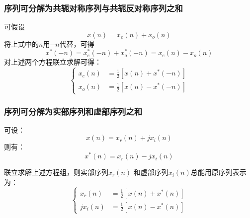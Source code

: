 \documentclass[notheorems,compress,mathserif,table]{beamer}
\begin{document}
\begin{frame}\frametitle{序列可分解为共轭对称序列与共轭反对称序列之和}%

可假设
\begin{equation*}
x(n) = x_{e}(n) + x_{o}(n)%
\end{equation*}
将上式中的$n$用$-n$代替，可得
\begin{equation*}
x^{*}(-n) = x^{*}_{e}(-n) + x^{*}_{o}(-n) = x_{e}(n) - x_{o}(n)
\end{equation*}
对上述两个方程联立求解可得：
\begin{equation*}
\left\{ \begin{aligned}
x_{e}(n) &= \frac{1}{2}[x(n) + x^{*}(-n)]\\
x_{o}(n) &= \frac{1}{2}[x(n) - x^{*}(-n)]
\end{aligned} \right.
\end{equation*}
\end{frame}



\begin{frame}\frametitle{序列可分解为实部序列和虚部序列之和}%
%
可设：
$$x(n) = x_{r}(n)+j x_{i}(n)$$
则有：
$$x^*(n) = x_{r}(n)-j x_{i}(n)$$

联立求解上述方程组，则实部序列$x_{r}(n)$ 和虚部序列$x_{i}(n)$总能用原序列表示为：
\begin{equation*}
\left\{ \begin{aligned}
x_{r}(n) &= \frac{1}{2}[x(n) + x^{*}(n)]\\
jx_{i}(n) &= \frac{1}{2}[x(n) - x^{*}(n)]
\end{aligned} \right.
\end{equation*}
\end{frame}
\end{document}
